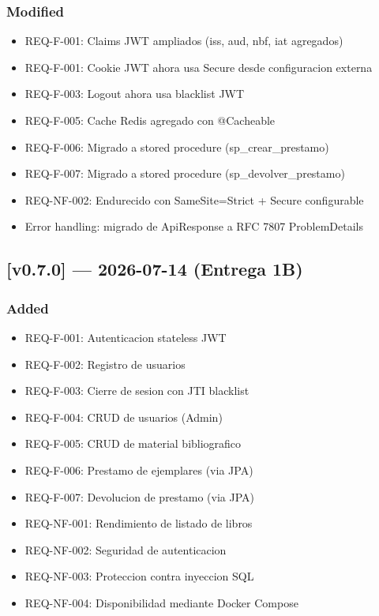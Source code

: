 \documentclass[
11pt,
a4paper,
]{report}
\providecommand{\tightlist}{%
	\setlength{\itemsep}{0pt}\setlength{\parskip}{0pt}}
\begin{document}
	\hypertarget{modified}{%
		\subsubsection{Modified}\label{modified}}
	
	\begin{itemize}
		\tightlist
		\item
		REQ-F-001: Claims JWT ampliados (iss, aud, nbf, iat agregados)
		\item
		REQ-F-001: Cookie JWT ahora usa Secure desde configuracion externa
		\item
		REQ-F-003: Logout ahora usa blacklist JWT
		\item
		REQ-F-005: Cache Redis agregado con @Cacheable
		\item
		REQ-F-006: Migrado a stored procedure (sp\_crear\_prestamo)
		\item
		REQ-F-007: Migrado a stored procedure (sp\_devolver\_prestamo)
		\item
		REQ-NF-002: Endurecido con SameSite=Strict + Secure configurable
		\item
		Error handling: migrado de ApiResponse a RFC 7807 ProblemDetails
	\end{itemize}
	
	\hypertarget{v0.7.0-2026-07-14-entrega-1b}{%
		\subsection{{[}v0.7.0{]} --- 2026-07-14 (Entrega 1B)}\label{v0.7.0-2026-07-14-entrega-1b}}
	
	\hypertarget{added-1}{%
		\subsubsection{Added}\label{added-1}}
	
	\begin{itemize}
		\tightlist
		\item
		REQ-F-001: Autenticacion stateless JWT
		\item
		REQ-F-002: Registro de usuarios
		\item
		REQ-F-003: Cierre de sesion con JTI blacklist
		\item
		REQ-F-004: CRUD de usuarios (Admin)
		\item
		REQ-F-005: CRUD de material bibliografico
		\item
		REQ-F-006: Prestamo de ejemplares (via JPA)
		\item
		REQ-F-007: Devolucion de prestamo (via JPA)
		\item
		REQ-NF-001: Rendimiento de listado de libros
		\item
		REQ-NF-002: Seguridad de autenticacion
		\item
		REQ-NF-003: Proteccion contra inyeccion SQL
		\item
		REQ-NF-004: Disponibilidad mediante Docker Compose
	\end{itemize}
	
\end{document}
